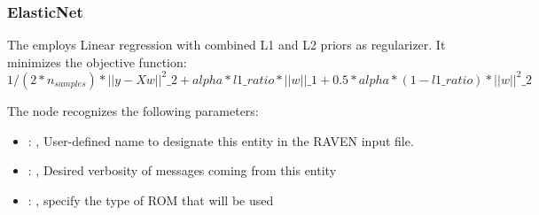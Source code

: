 \subsubsection{ElasticNet}
  The  employs                         Linear regression with combined L1 and L2
  priors as regularizer.                         It minimizes the objective function:
  \begin{equation}                         1/(2*n_{samples}) *||y - Xw||^2\_2+alpha*l1\_ratio*||w||\_1
  + 0.5 *alpha*(1 - l1\_ratio)*||w||^2\_2                         \end{equation}

  The  node recognizes the following parameters:
    \begin{itemize}
      \item {}: , 
        User-defined name to designate this entity in the RAVEN input file.
      \item {}: , 
        Desired verbosity of messages coming from this entity
      \item {}: , 
        specify the type of ROM that will be used
  \end{itemize}

